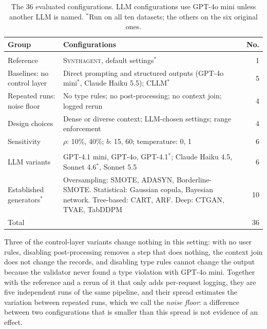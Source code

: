 \documentclass[conference]{IEEEtran}
\newcommand{\system}{\textsc{Synthagent}\xspace}
\begin{document}
\begin{table}[t]
\centering
\caption{The 36 evaluated configurations. LLM configurations use GPT-4o mini unless another LLM is named. $^{\ast}$Run on all ten datasets; the others on the six original ones.}
\label{tab:configs}
\footnotesize
\setlength{\tabcolsep}{3pt}
\renewcommand{\arraystretch}{1.15}
\begin{tabular}{@{}>{\raggedright\arraybackslash}p{}>{\raggedright\arraybackslash}p{}r@{}}
\toprule
Group & Configurations & No. \\
\midrule
\multicolumn{3}{@{}l}{\textit{Control layer (RQ1)}}\\
Reference & \system, default settings$^{\ast}$ & 1 \\
Baselines: no control layer & Direct prompting and structured outputs (GPT-4o mini$^{\ast}$, Claude Haiku 5.5); CLLM$^{\ast}$ & 5 \\
Repeated runs: noise floor & No type rules; no post-processing; no context join; logged rerun & 4 \\
Design choices & Dense or diverse context; LLM-chosen settings; range enforcement & 4 \\
Sensitivity & $\rho$: 10\%, 40\%; $b$: 15, 60; temperature: 0, 1 & 6 \\
\midrule
\multicolumn{3}{@{}l}{\textit{Comparison (RQ4)}}\\
LLM variants & GPT-4.1 mini, GPT-4o, GPT-4.1$^{\ast}$; Claude Haiku 4.5, Sonnet 4.6$^{\ast}$, Sonnet 5.5 & 6 \\
Established generators$^{\ast}$ & Oversampling: SMOTE, ADASYN, Borderline-SMOTE. Statistical: Gaussian copula, Bayesian network. Tree-based: CART, ARF. Deep: CTGAN, TVAE, TabDDPM & 10 \\
\midrule
Total & & 36 \\
\bottomrule
\end{tabular}
\end{table}

Three of the control-layer variants change nothing in this setting: with no user rules, disabling post-processing removes a step that does nothing, the context join does not change the records, and disabling type rules cannot change the output because the validator never found a type violation with GPT-4o mini. Together with the reference and a rerun of it that only adds per-request logging, they are five independent runs of the same pipeline, and their spread estimates the variation between repeated runs, which we call the \emph{noise floor}: a difference between two configurations that is smaller than this spread is not evidence of an effect.
\end{document}
